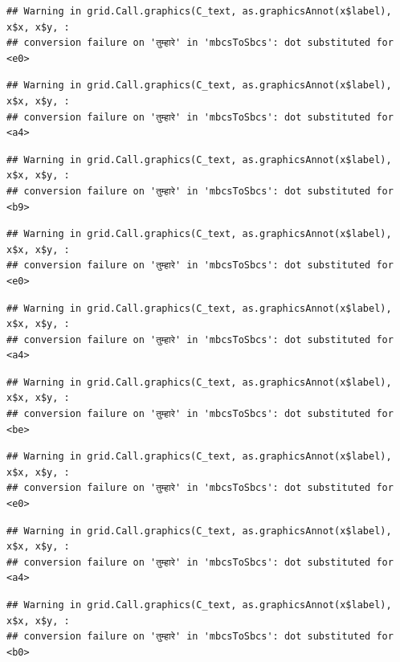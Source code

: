 \documentclass[
]{article}
\begin{document}
\begin{verbatim}
## Warning in grid.Call.graphics(C_text, as.graphicsAnnot(x$label), x$x, x$y, :
## conversion failure on 'तुम्हारे' in 'mbcsToSbcs': dot substituted for <e0>
\end{verbatim}

\begin{verbatim}
## Warning in grid.Call.graphics(C_text, as.graphicsAnnot(x$label), x$x, x$y, :
## conversion failure on 'तुम्हारे' in 'mbcsToSbcs': dot substituted for <a4>
\end{verbatim}

\begin{verbatim}
## Warning in grid.Call.graphics(C_text, as.graphicsAnnot(x$label), x$x, x$y, :
## conversion failure on 'तुम्हारे' in 'mbcsToSbcs': dot substituted for <b9>
\end{verbatim}

\begin{verbatim}
## Warning in grid.Call.graphics(C_text, as.graphicsAnnot(x$label), x$x, x$y, :
## conversion failure on 'तुम्हारे' in 'mbcsToSbcs': dot substituted for <e0>
\end{verbatim}

\begin{verbatim}
## Warning in grid.Call.graphics(C_text, as.graphicsAnnot(x$label), x$x, x$y, :
## conversion failure on 'तुम्हारे' in 'mbcsToSbcs': dot substituted for <a4>
\end{verbatim}

\begin{verbatim}
## Warning in grid.Call.graphics(C_text, as.graphicsAnnot(x$label), x$x, x$y, :
## conversion failure on 'तुम्हारे' in 'mbcsToSbcs': dot substituted for <be>
\end{verbatim}

\begin{verbatim}
## Warning in grid.Call.graphics(C_text, as.graphicsAnnot(x$label), x$x, x$y, :
## conversion failure on 'तुम्हारे' in 'mbcsToSbcs': dot substituted for <e0>
\end{verbatim}

\begin{verbatim}
## Warning in grid.Call.graphics(C_text, as.graphicsAnnot(x$label), x$x, x$y, :
## conversion failure on 'तुम्हारे' in 'mbcsToSbcs': dot substituted for <a4>
\end{verbatim}

\begin{verbatim}
## Warning in grid.Call.graphics(C_text, as.graphicsAnnot(x$label), x$x, x$y, :
## conversion failure on 'तुम्हारे' in 'mbcsToSbcs': dot substituted for <b0>
\end{verbatim}
\end{document}
